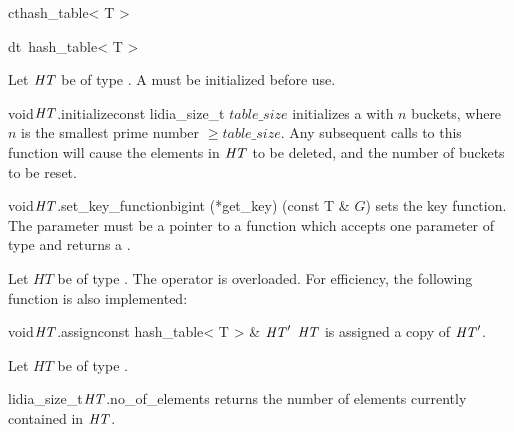 
\CONS

\begin{fcode}{ct}{hash_table< T >}{}
\end{fcode}

\begin{fcode}{dt}{~hash_table< T >}{}
\end{fcode}



\INIT

Let $\mathit{HT}$ be of type .  A  must be initialized
before use.

\begin{fcode}{void}{$\mathit{HT}$.initialize}{const lidia_size_t $\mathit{table\_size}$}
  initializes a  with $n$ buckets, where $n$ is the smallest prime number
  $\geq \mathit{table\_size}$.  Any subsequent calls to this function will cause the elements in
  $\mathit{HT}$ to be deleted, and the number of buckets to be reset.
\end{fcode}

\begin{fcode}{void}{$\mathit{HT}$.set_key_function}{bigint (*get_key) (const T & $G$)}
  sets the key function.  The parameter must be a pointer to a function which accepts one
  parameter of type  and returns a .
\end{fcode}



\ASGN

Let $HT$ be of type .  The operator \code{=} is overloaded.  For
efficiency, the following function is also implemented:

\begin{fcode}{void}{$\mathit{HT}$.assign}{const hash_table< T > & $\mathit{HT}'$}
  $\mathit{HT}$ is assigned a copy of $\mathit{HT}'$.
\end{fcode}



\ACCS

Let $HT$ be of type .

\begin{cfcode}{lidia_size_t}{$\mathit{HT}$.no_of_elements}{}
  returns the number of elements currently contained in $\mathit{HT}$.
\end{cfcode}

